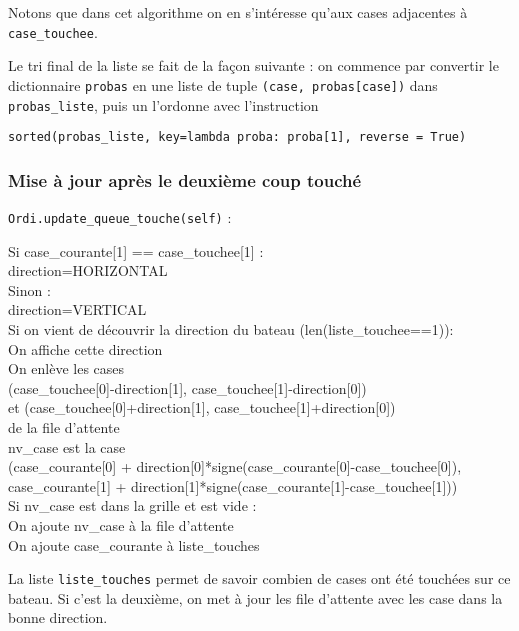 Notons que dans cet algorithme on en s'intéresse qu'aux cases adjacentes à \texttt{case\_touchee}.

\medskip

Le tri final de la liste se fait de la façon suivante : on commence par convertir le dictionnaire \texttt{probas} en une liste de tuple \texttt{(case, probas[case])} dans \texttt{probas\_liste}, puis un l'ordonne avec l'instruction
\begin{center}
\texttt{sorted(probas\_liste, key=lambda proba: proba[1], reverse = True)}
\end{center}

\newpage
\subsubsection{Mise à jour après le deuxième coup touché}\label{update_queue_touche}
\texttt{Ordi.update\_queue\_touche(self)} :
\begin{algo1}
Si case\_courante[1] == case\_touchee[1] :\\
direction=HORIZONTAL\\
Sinon :\\
direction=VERTICAL\\
Si on vient de découvrir la direction du bateau (len(liste\_touchee==1)):\\
On affiche cette direction\\
On enlève les cases \\
 (case\_touchee[0]-direction[1], case\_touchee[1]-direction[0])\\ 
et (case\_touchee[0]+direction[1], case\_touchee[1]+direction[0])\\
de la file d'attente\\
nv\_case est la case\\
(case\_courante[0] + direction[0]*signe(case\_courante[0]-case\_touchee[0]),\\
 case\_courante[1] + direction[1]*signe(case\_courante[1]-case\_touchee[1]))\\
Si nv\_case est dans la grille et est vide :\\
On ajoute nv\_case à la file d'attente\\
On ajoute case\_courante à liste\_touches\\
\end{algo1}

La liste \texttt{liste\_touches} permet de savoir combien de cases ont été touchées sur ce bateau. Si c'est la deuxième, on met à jour les file d'attente avec les case dans la bonne direction.

